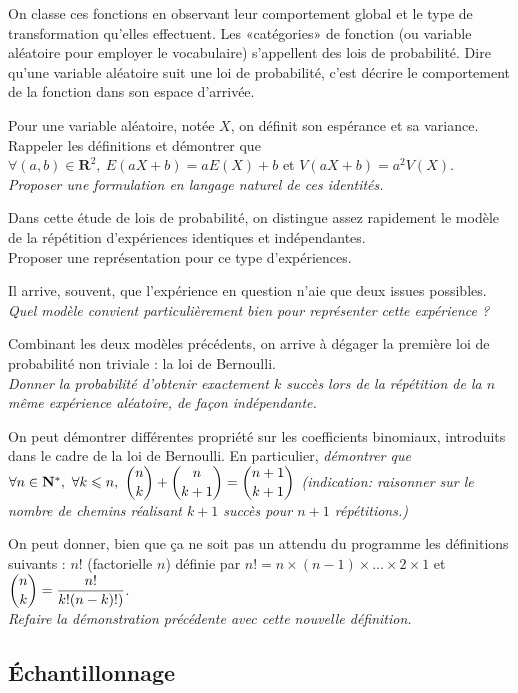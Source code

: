 \documentclass[a4paper,12pt,french]{article}
\newcommand{\N}{\mathbf{N}}
\newcommand{\R}{\mathbf{R}}
\begin{document}
On classe ces fonctions en observant leur comportement global et le type
de transformation qu'elles effectuent. Les «catégories» de fonction (ou
variable aléatoire pour employer le vocabulaire) s'appellent des lois de
probabilité. Dire qu'une variable aléatoire suit une loi de probabilité,
c'est décrire le comportement de la fonction dans son espace d'arrivée.

Pour une variable aléatoire, notée $X$, on définit son espérance et sa
variance. Rappeler les définitions et démontrer que $\forall
(a,b)\in\R^2,\ E(aX+b) = aE(X) + b$ et $V(aX + b) = a^2V(X)$.\\
\emph{Proposer  une formulation en langage naturel de ces identités.}

Dans cette étude de lois de probabilité, on distingue assez rapidement le
modèle de la répétition d'expériences identiques et indépendantes.\\
Proposer une représentation pour ce type d'expériences.

Il arrive, souvent, que l'expérience en question n'aie que deux issues
possibles.\\
\emph{Quel modèle convient particulièrement bien pour représenter cette
expérience ?}

Combinant les deux modèles précédents, on arrive à dégager la première
loi de probabilité non triviale : la loi de Bernoulli.\\
\emph{Donner la probabilité d'obtenir exactement $k$ succès lors de la
répétition de la $n$ même expérience aléatoire, de façon indépendante.}

On peut démontrer différentes propriété sur les coefficients binomiaux,
introduits dans le cadre de la loi de Bernoulli. En particulier,
\emph{démontrer que $\forall n\in\N^*,\ \forall k \leqslant n,\ \dbinom{n}{k}
+ \dbinom{n}{k+1} = \dbinom{n+1}{k+1}$ (indication: raisonner sur le
nombre de chemins réalisant $k+1$ succès pour $n+1$ répétitions.)}

On peut donner, bien que ça ne soit pas un attendu du programme les
définitions suivants : $n!$ (factorielle $n$) définie par $n! = n \times
(n-1) \times \dots \times 2 \times 1$ et $\dbinom{n}{k} =
\dfrac{n!}{k!(n-k)!)}$.\\
\emph{Refaire la démonstration précédente avec cette nouvelle
définition.}

\subsection{Échantillonnage}
\end{document}
